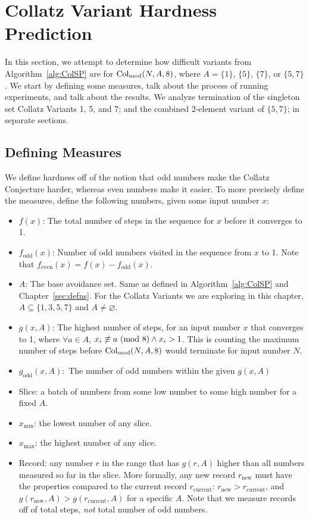 \chapter{Collatz Variant Hardness Prediction} \label{sec:subhrdnspred}
In this section, we attempt to determine how difficult variants from Algorithm~\ref{alg:ColSP} are for $\mathrm{Col}_{\text{mod}}(N,A,8)$, where $A= \{1\}$, $\{5\}$, $\{7\}$, or $\{5,7\}$. We start by defining some measures, talk about the process of running experiments, and talk about the results. We analyze termination of the singleton set Collatz Variants 1, 5, and 7; and the combined 2-element variant of $\{5,7\}$; in separate sections. 
\section{Defining Measures} \label{subsec:algdefinemeasure} 
We define hardness off of the notion that odd numbers make the Collatz Conjecture harder, whereas even numbers make it easier. To more precisely define the measures, define the following numbers, given some input number $x$:
\begin{itemize}
    \item $f(x)$: The total number of steps in the sequence for $x$ before it converges to 1.
    \item $f_\text{odd}(x)$: Number of odd numbers visited in the sequence from $x$ to 1. Note that $f_\text{even}(x) = f(x) - f_\text{odd}(x)$.
    \item $A$: The base avoidance set. Same as defined in Algorithm~\ref{alg:ColSP} and Chapter~\ref{sec:defns}. For the Collatz Variants we are exploring in this chapter, $A \subseteq \{1, 3, 5, 7\}$ and $A \ne \varnothing$.
    \item $g(x,A)$: The highest number of steps, for an input number $x$ that converges to 1, where $\forall a \in A$, $x_i \not\equiv a \ (\mathrm{mod}\ 8) \wedge x_i > 1$. This is counting the maximum number of steps before $\mathrm{Col}_{\text{mod}}(N,A,8)$ would terminate for input number $N$.
    \item $g_\text{odd}(x,A):$ The number of odd numbers within the given $g(x,A)$
    \item Slice: a batch of numbers from some low number to some high number for a fixed $A$.
    \item $x_{\min}$: the lowest number of any slice.
    \item $x_{\max}$: the highest number of any slice.

    \item Record: any number $r$ in the range that has $g(r,A)$ higher than all numbers measured so far in the slice. More formally, any new record $r_\text{new}$ must have the properties compared to the current record $r_\text{current}$: $r_\text{new} > r_\text{current}$, and $g(r_\text{new},A) > g(r_\text{current},A)$ for a specific $A$. Note that we measure records off of total steps, \textit{not} total number of odd numbers.
      
\end{itemize}
